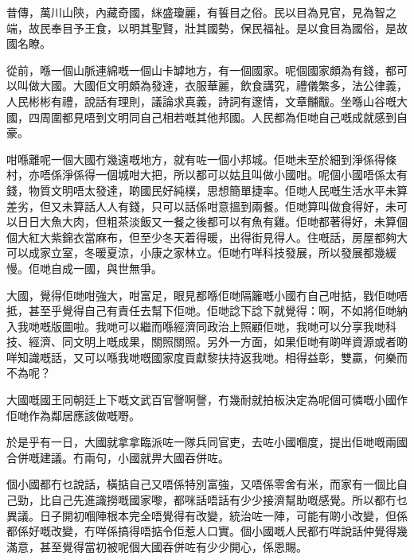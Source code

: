 昔傳，萬川山陝，內藏奇國，䋛盛瓊麗，有䭁目之俗。民以目為見官，見為智之端，故民奉目予王食，以明其聖賢，壯其國勢，保民福祉。是以食目為國俗，是故國名瞭。



從前，喺一個山脈連綿嘅一個山卡罅地方，有一個國家。呢個國家頗為有錢，都可以叫做大國。大國佢文明頗為發達，衣服華麗，飲食講究，禮儀繁多，法公律義，人民彬彬有禮，說話有理則，議論求真義，詩詞有邃情，文章黼黻。坐喺山谷嘅大國，四周圍都見唔到文明同自己相若嘅其他邦國。人民都為佢哋自己嘅成就感到自豪。



咁喺離呢一個大國冇幾遠嘅地方，就有咗一個小邦城。佢哋未至於細到淨係得條村，亦唔係淨係得一個城咁大把，所以都可以姑且叫做小國咁。呢個小國唔係太有錢，物質文明唔太發達，啲國民好純樸，思想簡單捷率。佢哋人民嘅生活水平未算差劣，但又未算話人人有錢，只可以話係咁意搵到兩餐。佢哋算叫做食得好，未可以日日大魚大肉，但粗茶淡飯又一餐之後都可以有魚有雞。佢哋都著得好，未算個個大紅大紫錦衣當麻布，但至少冬天着得暖，出得街見得人。住嘅話，房屋都夠大可以成家立室，冬暖夏涼，小康之家林立。佢哋冇咩科技發展，所以發展都幾緩慢。佢哋自成一國，與世無爭。



大國，覺得佢哋咁強大，咁富足，眼見都喺佢哋隔籬嘅小國冇自己咁掂，戥佢哋唔抵，甚至乎覺得自己有責任去幫下佢哋。佢哋諗下諗下就覺得：啊，不如將佢哋納入我哋嘅版圖啦。我哋可以繼而喺經濟同政治上照顧佢哋，我哋可以分享我哋科技、經濟、同文明上嘅成果，關照關照。另外一方面，如果佢哋有啲咩資源或者啲咩知識嘅話，又可以喺我哋嘅國家度貢獻黎扶持返我哋。相得益彰，雙贏，何樂而不為呢？



大國嘅國王同朝廷上下嘅文武百官謦啊謦，冇幾耐就拍板決定為呢個可憐嘅小國作佢哋作為鄰居應該做嘅嘢。



於是乎有一日，大國就拿拿臨派咗一隊兵同官吏，去咗小國嗰度，提出佢哋嘅兩國合併嘅建議。冇兩句，小國就畀大國吞併咗。



個小國都冇乜說話，橫掂自己又唔係特別富強，又唔係零舍有米，而家有一個比自己勁，比自己先進識撈嘅國家嚟，都咪話唔話有少少接濟幫助嘅感覺。所以都冇乜異議。日子開初嗰陣根本完全唔覺得有改變，統治咗一陣，可能有啲小改變，但係都係好嘅改變，冇咩係搞得唔掂令佢惹人口實。個小國嘅人民都冇咩說話仲覺得幾滿意，甚至覺得當初被呢個大國吞併咗有少少開心，係恩賜。



